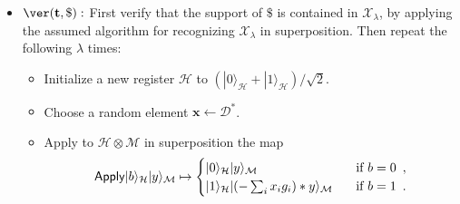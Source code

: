 \documentclass{article}\usepackage[a4paper,margin=20mm]{geometry}
\numberwithin{theorem}{section}
\numberwithin{equation}{section}
\newcommand{\Z}{\mathbb{Z}}
\newcommand{\G}{\mathbb{G}}
\newcommand{\ev}{{\mathbf{e}}}
\newcommand{\sv}{{\mathbf{s}}}
\newcommand{\tv}{{\mathbf{t}}}
\newcommand{\xv}{{\mathbf{x}}}
\newcommand{\Am}{{\mathbf{A}}}
\newcommand{\Ds}{{\mathcal{D}}}
\newcommand{\Hs}{{\mathcal{H}}}
\newcommand{\Ms}{{\mathcal{M}}}
\newcommand{\Ss}{{\mathcal{S}}}
\newcommand{\Xs}{{\mathcal{X}}}
\newcommand{\QFT}{{\sf QFT}}
\begin{document}
\begin{construction}
\begin{itemize}
\begin{itemize}
			\item Apply $\QFT_{\Z_N^m}$ to $\Ss$. Using the QFT rules given above, this yields the state negligibly close to:
			\begin{align*}
				&\frac{1}{N^n}\sum_{g\in\G_\lambda}\left(\sum_{\sv,\ev\in\Z_N^n}\sqrt{\Ds_{N/\sigma,N/2-1}(\ev)}e^{i2\pi (g\cdot \sv)}|\Am^T\cdot\sv+\ev\rangle_\Ss\right)|g*x_\lambda\rangle_\Ms\\
				&=\frac{1}{|\G_\lambda|}\sum_{g\in\G_\lambda}\left(\sum_{h\in\G_\lambda,\ev\in\Z_N^n}\sqrt{\Ds_{N/\sigma,N/2-1}(\ev)}e^{i2\pi (g\cdot\phi(h))}|\Am^T\cdot\phi(h)+\ev\rangle_\Ss\right)|g*x_\lambda\rangle_\Ms\\
				&=\frac{1}{\sqrt{|\G_\lambda|}}\sum_{g\in\G_\lambda}\left(\frac{1}{\sqrt{|\G_\lambda|}}\sum_{h\in\G_\lambda,\ev\in\Z_N^n}\sqrt{\Ds_{N/\sigma,N/2-1}(\ev)}\chi(g,h)|\Am^T\cdot\phi(h)+\ev\rangle_\Ss\right)|g*x_\lambda\rangle_\Ms\enspace .
			\end{align*}
			\item Measure $\Ss$, giving the serial number $\tv:=\Am^T\cdot\phi(h)+\ev$. $\ev$ is distributed negligibly close to $\Ds_{N/\sigma}$, meaning with overwhelming probability each entry is in $[-N/16Bm,N/16Bm]= [- C/2,C/2]\subseteq [-C,C]$. This means, to within negligible error, $\tv$ uniquely determines $\phi(h)$ and hence $h$.	Therefore, the $\Ms$ register then collapses to a state negligibly close to \[\frac{1}{\sqrt{|\G_\lambda|}}\sum_{g\in\G_\lambda}\chi(g,h)|g*x_\lambda\rangle_\Ms=:|\G_\lambda^h*x_\lambda\rangle\enspace .\]
			Note that $h$ is unknown. Output $(\tv,|\G_\lambda^h*x_\lambda\rangle)$.
		\end{itemize}
		
		\item $\ver(\tv,\$):$ First verify that the support of $\$$ is contained in $\Xs_\lambda$, by applying the assumed algorithm for recognizing $\Xs_\lambda$ in superposition. Then repeat the following $\lambda$ times:
		\begin{itemize}
			\item Initialize a new register $\Hs$ to $(|0\rangle_\Hs+|1\rangle_\Hs)/\sqrt{2}$. 
			\item Choose a random element $\xv\gets\Ds^*$.
			\item Apply to $\Hs\otimes\Ms$ in superposition the map
			\[{\sf Apply}|b\rangle_\Hs|y\rangle_\Ms\mapsto \begin{cases}|0\rangle_\Hs|y\rangle_\Ms&\text{ if }b=0\enspace ,\\|1\rangle_\Hs|(-\sum_i x_i g_i)*y\rangle_\Ms\enspace&\text{ if }b=1\enspace .\end{cases}\]
			

\end{itemize}
\end{itemize}
\end{construction}
\end{document}
